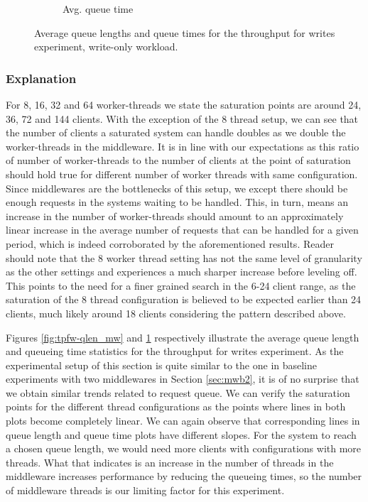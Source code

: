 \documentclass[11pt,a4paper]{article}
\begin{document}
\begin{figure}[h!]
\begin{subfigure}{.5\textwidth}
  \caption{Avg. queue time}
  \label{fig:tpfw-qtime_mw}
\end{subfigure}
\caption{Average queue lengths and queue times for the throughput for writes experiment, write-only workload.}
\label{fig:tpfw_stats_mw}
\end{figure}

\subsubsection{Explanation} \label{sec:tpfw-exp}
\par For 8, 16, 32 and 64 worker-threads we state the saturation points are around 24, 36, 72 and 144 clients. With the exception of the 8 thread setup, we can see that the number of clients a saturated system can handle doubles as we double the worker-threads in the middleware. It is in line with our expectations as this ratio of number of worker-threads to the number of clients at the point of saturation should hold true for different number of worker threads with same configuration. Since middlewares are the bottlenecks of this setup, we except there should be enough requests in the systems waiting to be handled. This, in turn, means an increase in the number of worker-threads should amount to an approximately linear increase in the average number of requests that can be handled for a given period, which is indeed corroborated by the aforementioned results. Reader should note that the 8 worker thread setting has not the same level of granularity as the other settings and experiences a much sharper increase before leveling off. This points to the need for a finer grained search in the 6-24 client range, as the saturation of the 8 thread configuration is believed to be expected earlier than 24 clients, much likely around 18 clients considering the pattern described above.
\par Figures \ref{fig:tpfw-qlen_mw} and \ref{fig:tpfw-qtime_mw} respectively illustrate the average queue length and queueing time statistics for the throughput for writes experiment. As the experimental setup of this section is quite similar to the one in baseline experiments with two middlewares in Section \ref{sec:mwb2}, it is of no surprise that we obtain similar trends related to request queue. We can verify the saturation points for the different thread configurations as the points where lines in both plots become completely linear. We can again observe that corresponding lines in queue length and queue time plots have different slopes. For the system to reach a chosen queue length, we would need more clients with configurations with more threads. What that indicates is an increase in the number of threads in the middleware increases performance by reducing the queueing times, so the number of middleware threads is our limiting factor for this experiment.
\end{document}
